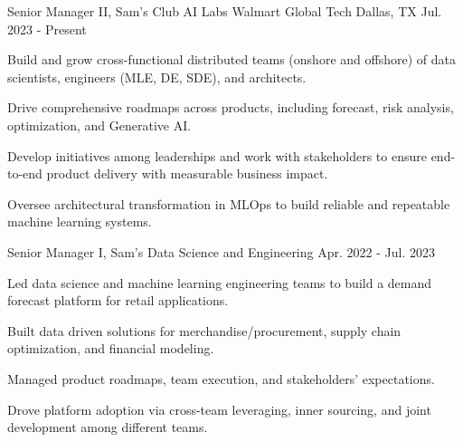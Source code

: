 

\begin{cventries}

	\cventry
		{Senior Manager II, Sam's Club AI Labs} %
		{Walmart Global Tech} %
		{Dallas, TX} %
		{Jul. 2023 - Present} %
		{
			\begin{cvitems} %
				\item {Build and grow cross-functional distributed teams (onshore and offshore) 
				of data scientists, engineers (MLE, DE, SDE), and architects.}
				\item {Drive comprehensive roadmaps across products, including forecast, risk 
				analysis, optimization, and Generative AI.}
				\item {Develop initiatives among leaderships and work with stakeholders to ensure 
				end-to-end product delivery with measurable business impact.}
				\item {Oversee architectural transformation in MLOps to build reliable and 
				repeatable machine learning systems.}
			\end{cvitems}
		}

	\cventry
		{Senior Manager I, Sam's Data Science and Engineering} %
		{} %
		{} %
		{Apr. 2022 - Jul. 2023} %
		{
			\begin{cvitems} %
				\item {Led data science and machine learning engineering teams to build a demand 
				forecast platform for retail applications.}
				\item {Built data driven solutions for merchandise/procurement, supply chain 
				optimization, and financial modeling.}
				\item {Managed product roadmaps, team execution, and stakeholders' expectations.}
				\item {Drove platform adoption via cross-team leveraging, inner sourcing, and 
				joint development among different teams.}
			\end{cvitems}
	}



\end{cventries}
